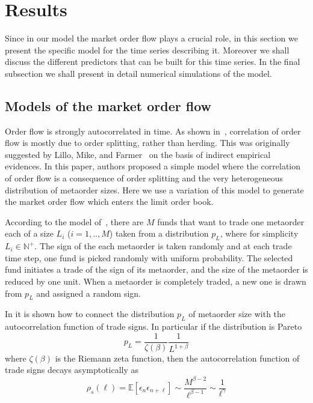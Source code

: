 \documentclass[12pt]{iopart}
\begin{document}
\section{Results}
\label{sec:Results}
Since in our model the market order flow plays a crucial role, in this section we present the specific model for the time series describing it. Moreover we shall discuss the different predictors that can be built for this time series. In the final subsection we shall present in detail numerical simulations of the model.

\subsection{Models of the market order flow}
Order flow is strongly autocorrelated in time. As shown in~\cite{toth2011order}, correlation of order flow is mostly due to order splitting, rather than herding. This was originally suggested by Lillo, Mike, and Farmer~\cite{lillo2005theory} on the basis of indirect empirical evidences. In this paper, authors proposed a simple model where the correlation of order flow is a consequence of order splitting and the very heterogeneous distribution of metaorder sizes. Here we use a variation of this model to generate the market order flow which enters the limit order book.

According to the model of~\cite{lillo2005theory}, there are $M$ funds that want to trade one metaorder each of a size $L_i$ ($i=1,..,M$) taken from a distribution $p_L$, where for simplicity $L_i\in \mathbb N^+$. The sign of the each metaorder is taken randomly and at each trade time step, one fund is picked randomly with uniform probability. The selected fund initiates a trade of the sign of its metaorder, and the size of the metaorder is reduced by one unit. When a metaorder is completely traded, a new one is drawn from $p_L$ and assigned a random sign. 

In \cite{lillo2005theory} it is shown how to connect the distribution $p_L$ of metaorder size with the autocorrelation function of trade signs. In particular if the distribution is Pareto
\begin{equation}\label{eqn:Pareto}
p_L=\frac{1}{\zeta(\beta)}\frac{1}{L^{1+\beta}}
\end{equation}
where $\zeta(\beta)$ is the Riemann zeta function, then the autocorrelation function of trade signs decays asymptotically as
\begin{equation}\label{eqn:acfLMF}
\rho_s(\ell)=\mathbb{E}[\epsilon_n \epsilon_{n+\ell}]\sim \frac{M^{\beta-2}}{\ell^{\beta-1}} \sim \frac{1}{\ell^\gamma}
\end{equation}
\end{document}
